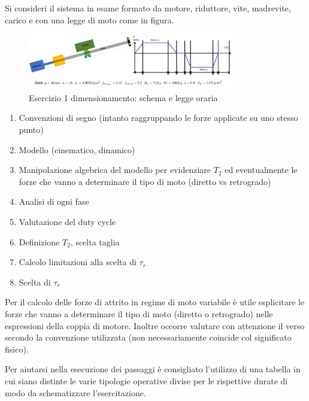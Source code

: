 Si consideri il sistema in esame formato da motore, riduttore, vite, madrevite, carico e con una legge di moto come in figura.\label{EsercizioDimRid}

\begin{figure}[h]
    \centering
    \includegraphics[width=0.8\textwidth]{Immagini/esercizio1_dim_rid_vite.png}
    \caption{Esercizio 1 dimensionamento: schema e legge oraria}
\end{figure}

\begin{enumerate}[label=(\roman*)]
    \item Convenzioni di segno (intanto raggruppando le forze applicate su uno stesso punto)
    \item Modello (cinematico, dinamico)
    \item Manipolazione algebrica del modello per evidenziare $T_2$ ed eventualmente le forze che vanno a determinare il tipo di moto (diretto vs retrogrado)
    \item Analisi di ogni fase
    \item Valutazione del duty cycle
    \item Definizione $T_2$, scelta taglia
    \item Calcolo limitazioni alla scelta di $\tau_r$
    \item Scelta di $\tau_r$
\end{enumerate}

Per il calcolo delle forze di attrito in regime di moto variabile è utile esplicitare le forze che vanno a determinare il tipo di moto (diretto o retrogrado) nelle espressioni della coppia di motore.
Inoltre occorre valutare con attenzione il verso secondo la convenzione utilizzata (non necessariamente coincide col significato fisico).

Per aiutarsi nella esecuzione dei passaggi è consigliato l'utilizzo di una tabella in cui siano distinte le varie tipologie operative divise per le rispettive durate di modo da schematizzare l'esercitazione.

